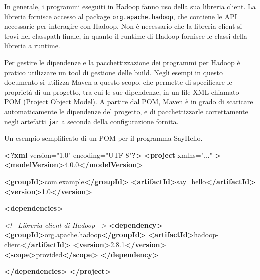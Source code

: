 \documentclass[italian,a4paper, twoside, 12pt]{report}
\newenvironment{Shaded}{}{}
\newcommand{\KeywordTok}[1]{\textcolor[rgb]{0.00,0.44,0.13}{\textbf{#1}}}
\newcommand{\StringTok}[1]{\textcolor[rgb]{0.25,0.44,0.63}{#1}}
\newcommand{\CommentTok}[1]{\textcolor[rgb]{0.38,0.63,0.69}{\textit{#1}}}
\newcommand{\OtherTok}[1]{\textcolor[rgb]{0.00,0.44,0.13}{#1}}
\newcommand{\NormalTok}[1]{#1}
\begin{document}
In generale, i programmi eseguiti in Hadoop fanno uso della sua libreria
client. La libreria fornisce accesso al package
\texttt{org.apache.hadoop}, che contiene le API necessarie per
interagire con Hadoop. Non è necessario che la libreria client si trovi
nel classpath finale, in quanto il runtime di Hadoop fornisce le classi
della libreria a runtime.

Per gestire le dipendenze e la pacchettizzazione dei programmi per
Hadoop è pratico utilizzare un tool di gestione delle build. Negli
esempi in questo documento si utilizza Maven a questo scopo, che
permette di specificare le proprietà di un progetto, tra cui le sue
dipendenze, in un file XML chiamato POM (Project Object Model). A
partire dal POM, Maven è in grado di scaricare automaticamente le
dipendenze del progetto, e di pacchettizzarle correttamente negli
artefatti \texttt{jar} a seconda della configurazione fornita.

\begin{codelisting}

\caption{Un esempio semplificato di un POM per il programma SayHello.}

\hypertarget{lst:pom_example}{\label{lst:pom_example}}
\begin{Shaded}
\begin{Highlighting}[numbers=left,,]
\KeywordTok{<?xml}\NormalTok{ version="1.0" encoding="UTF-8"}\KeywordTok{?>}
\KeywordTok{<project}\OtherTok{ xmlns=}\StringTok{"..."} \KeywordTok{>}
    \KeywordTok{<modelVersion>}\NormalTok{4.0.0}\KeywordTok{</modelVersion>}

    \KeywordTok{<groupId>}\NormalTok{com.example}\KeywordTok{</groupId>}
    \KeywordTok{<artifactId>}\NormalTok{say_hello}\KeywordTok{</artifactId>}
    \KeywordTok{<version>}\NormalTok{1.0}\KeywordTok{</version>}

    \KeywordTok{<dependencies>}

        \CommentTok{<!-- Libreria client di Hadoop -->}
        \KeywordTok{<dependency>}
            \KeywordTok{<groupId>}\NormalTok{org.apache.hadoop}\KeywordTok{</groupId>}
            \KeywordTok{<artifactId>}\NormalTok{hadoop-client}\KeywordTok{</artifactId>}
            \KeywordTok{<version>}\NormalTok{2.8.1}\KeywordTok{</version>}
            \KeywordTok{<scope>}\NormalTok{provided}\KeywordTok{</scope>}
        \KeywordTok{</dependency>}

    \KeywordTok{</dependencies>}
\KeywordTok{</project>}
\end{Highlighting}
\end{Shaded}

\end{codelisting}
\end{document}
